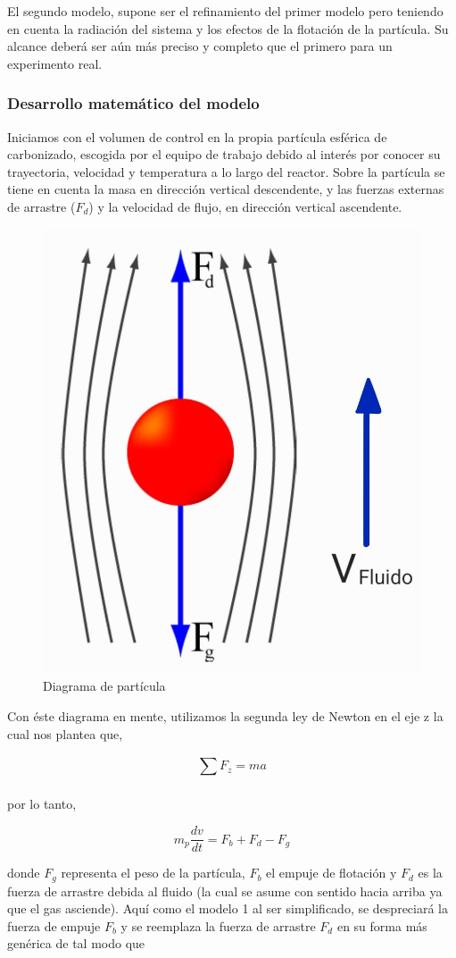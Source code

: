 \documentclass[11pt,stdletter,orderfromtodate,sigleft,twoside]{report}
\begin{document}
El segundo modelo, supone ser el refinamiento del primer modelo pero teniendo en cuenta la radiación del sistema y los efectos de la flotación de la partícula. Su alcance deberá ser aún más preciso y completo que el primero para un experimento real. 

\subsubsection{Desarrollo matemático del modelo}
Iniciamos con el volumen de control en la propia partícula esférica de carbonizado, escogida por el equipo de trabajo debido al interés por conocer su trayectoria, velocidad y temperatura a lo largo del reactor. Sobre la partícula se tiene en cuenta la masa en dirección vertical descendente, y las fuerzas externas de arrastre ($F_d$) y la velocidad de flujo, en dirección vertical ascendente.

\begin{figure}[H]
    \centering
    \includegraphics[width=0.2\linewidth]{Imagen de WhatsApp 2025-05-09 a las 11.36.50_4a59f02e.jpg}
    \caption{Diagrama de partícula}
    \label{Diagrama partícula}
\end{figure}

Con éste diagrama en mente, utilizamos la segunda ley de Newton en el eje z la cual nos plantea que,

\begin{equation}
    \sum_{}^{}F_{z}=ma
\end{equation}

por lo tanto,

\begin{equation}
    m_{p}\frac{dv}{dt}=F_{b}+F_{d}-F_{g}
    \label{Mov}
\end{equation}

donde $F_g$ representa el peso de la partícula, $F_b$ el empuje de flotación y $F_d$ es la fuerza de arrastre debida al fluido (la cual se asume con sentido hacia arriba ya que el gas asciende). Aquí como el modelo 1 al ser simplificado, se despreciará la fuerza de empuje $F_b$ y se reemplaza la fuerza de arrastre $F_d$ en su forma más genérica de tal modo que
\end{document}
